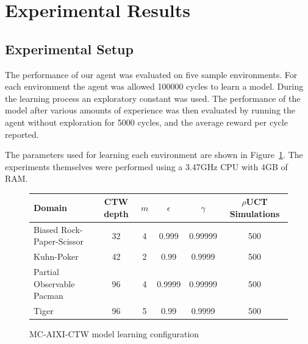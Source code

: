 \documentclass[paper=a4, fontsize=11pt]{scrartcl} %
\numberwithin{equation}{section} %
\numberwithin{figure}{section} %
\numberwithin{table}{section} %
\begin{document}


\section{\label{results}Experimental Results}
\subsection{Experimental Setup}

\setlength\parindent{20pt}
The performance of our agent was evaluated on five sample environments. For each environment the agent was allowed 100000 cycles to learn a model. During the learning process an exploratory constant was used. The performance of the model after various amounts of experience was then evaluated by running the agent without exploration for 5000 cycles, and the average reward per cycle reported.

The parameters used for learning each environment are shown in Figure~\ref{tab:setup}. The experiments themselves were performed using a 3.47GHz CPU with 4GB of RAM.

\begin{figure}[H]
\centering
\begin{tabular}{|l|c|c|c|c|c|}
\hline
Domain & CTW depth & $m$ & $\epsilon$ & $\gamma$ & $\rho$UCT Simulations\\\hline
Biased Rock-Paper-Scissor & 32 & 4 & 0.999 & 0.99999 & 500\\
Kuhn-Poker & 42 & 2 & 0.99 & 0.9999 & 500\\
Partial Observable Pacman & 96 & 4 & 0.9999 & 0.99999 & 500\\
Tiger & 96 & 5 & 0.99 & 0.9999 & 500\\\hline
\end{tabular}
\caption{\label{tab:setup}MC-AIXI-CTW model learning configuration}
\end{figure}
\end{document}
